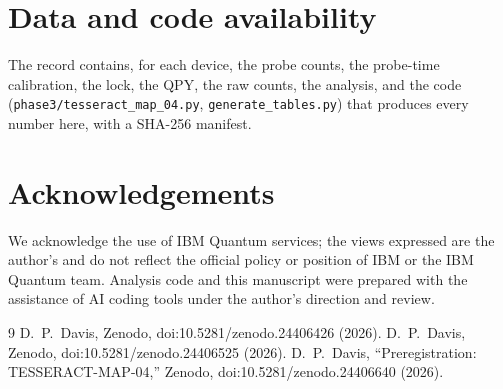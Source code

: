 \documentclass[10pt,twocolumn]{article}
\begin{document}
\section*{Data and code availability}
The record contains, for each device, the probe counts, the probe-time calibration, the lock, the
QPY, the raw counts, the analysis, and the code (\texttt{phase3/tesseract\_map\_04.py},
\texttt{generate\_tables.py}) that produces every number here, with a SHA-256 manifest.

\section*{Acknowledgements}
We acknowledge the use of IBM Quantum services; the views expressed are the author's and do not
reflect the official policy or position of IBM or the IBM Quantum team. Analysis code and this
manuscript were prepared with the assistance of AI coding tools under the author's direction and
review.

\begin{thebibliography}{9}\small
{} D.~P.~Davis, Zenodo, doi:10.5281/zenodo.24406426 (2026).
 D.~P.~Davis, Zenodo, doi:10.5281/zenodo.24406525 (2026).
 D.~P.~Davis, ``Preregistration: TESSERACT-MAP-04,'' Zenodo, doi:10.5281/zenodo.24406640 (2026).
\end{thebibliography}
\end{document}
